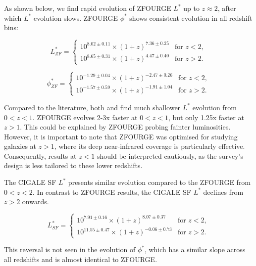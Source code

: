 As shown below, we find rapid evolution of ZFOURGE $L^{*}$ up to $z\approx2$, after which $L^{*}$ evolution slows. ZFOURGE $\phi^{*}$ shows consistent evolution in all redshift bins: 

\begin{equation*}
    L^{*}_{ZF} =
    \begin{cases} 
        10^{8.02 \pm 0.11} \times (1+z)^{7.36 \pm 0.25} & \text{for } z < 2, \\
        10^{8.65 \pm 0.31} \times (1+z)^{4.47 \pm 0.40} & \text{for } z > 2.
    \end{cases}
\end{equation*}

\begin{equation*}
    \phi^{*}_{ZF} =
    \begin{cases} 
        10^{-1.29 \pm 0.04} \times (1+z)^{-2.47 \pm 0.26} & \text{for } z < 2, \\
        10^{-1.57 \pm 0.59} \times (1+z)^{-1.91 \pm 1.04} & \text{for } z > 2.
    \end{cases}
\end{equation*}

Compared to the literature, both \cite{gruppioni_herschel_2013} and \cite{magnelli_deepest_2013} find much shallower $L^{*}$ evolution from $0<z<1$. ZFOURGE evolves 2-3x faster at $0<z<1$, but only 1.25x faster at $z>1$. This could be explained by ZFOURGE probing fainter luminosities. However, it is important to note that ZFOURGE was optimised for studying galaxies at $z>1$, where its deep near-infrared coverage is particularly effective. Consequently, results at $z<1$ should be interpreted cautiously, as the survey's design is less tailored to these lower redshifts. 

The CIGALE SF $L^{*}$ presents similar evolution compared to the ZFOURGE from $0<z<2$. In contrast to ZFOURGE results, the CIGALE SF $L^{*}$ declines from $z>2$ onwards. 

\begin{equation*}
    L^{*}_{SF} =
    \begin{cases} 
        10^{7.91 \pm 0.16} \times (1+z)^{8.07 \pm 0.37} & \text{for } z < 2, \\
        10^{11.55 \pm 0.47} \times (1+z)^{-0.06 \pm 0.73} & \text{for } z > 2.
    \end{cases}
\end{equation*}

This reversal is not seen in the evolution of $\phi^{*}$, which has a similar slope across all redshifts and is almost identical to ZFOURGE. 

